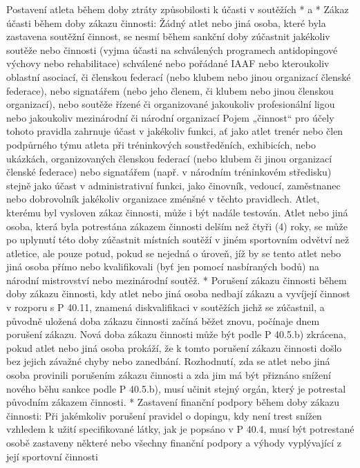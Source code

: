 Postavení atleta během doby ztráty způsobilosti k účasti v soutěžích
* \begitems \style a
  * Zákaz účasti během doby zákazu činnosti: Žádný atlet nebo jiná osoba, které byla zastavena soutěžní činnost, se nesmí během sankční doby zúčastnit jakékoliv soutěže nebo činnosti (vyjma účasti na schválených programech antidopingové výchovy nebo rehabilitace) schválené nebo pořádané IAAF nebo kteroukoliv oblastní asociací, či členskou federací (nebo klubem nebo jinou organizací členské federace), nebo signatářem (nebo jeho členem, či klubem nebo jinou členskou organizací), nebo soutěže řízené či organizované jakoukoliv profesionální ligou nebo jakoukoliv mezinárodní či národní organizací Pojem „činnost“ pro účely tohoto pravidla zahrnuje účast v jakékoliv funkci, ať jako atlet trenér nebo člen podpůrného týmu atleta při tréninkových soustředěních, exhibicích, nebo ukázkách, organizovaných členskou federací (nebo klubem či jinou organizací členské federace) nebo signatářem (např. v národním tréninkovém středisku) stejně jako účast v administrativní funkci, jako činovník, vedoucí, zaměstnanec nebo dobrovolník jakékoliv organizace zménšné v těchto pravidlech. Atlet, kterému byl vysloven zákaz činnosti, může i být nadále testován. Atlet nebo jiná osoba, která byla potrestána zákazem činnosti delším než čtyři (4) roky, se může po uplynutí této doby zúčastnit místních soutěží v jiném sportovním odvětví než atletice, ale pouze potud, pokud se nejedná o úroveň, jíž by se tento atlet nebo jiná osoba přímo nebo kvalifikovali (byť jen pomocí nasbíraných bodů) na národní mistrovství nebo mezinárodní soutěž.
  * Porušení zákazu činnosti během doby zákazu činnosti, kdy atlet nebo jiná osoba nedbají zákazu a vyvíjejí činnost v rozporu s P 40.11, znamená diskvalifikaci v soutěžích jichž se zúčastnil, a původně uložená doba zákazu činnosti začíná běžet znovu, počínaje dnem porušení zákazu. Nová doba zákazu činnosti může být podle P 40.5.b) zkrácena, pokud atlet nebo jiná osoba prokáží, že k tomto porušení zákazu činnosti došlo bez jejich závažné chyby nebo zanedbání. Rozhodnutí, zda se atlet nebo jiná osoba provinili porušením zákazu činnosti a zda jim má být přiznáno snížení nového běhu sankce podle P 40.5.b), musí učinit stejný orgán, který je potrestal původním zákazem činnosti.
  * Zastavení finanční podpory během doby zákazu činnosti: Při jakémkoliv porušení pravidel o dopingu, kdy není trest snížen vzhledem k užití specifikované látky, jak je popsáno v P 40.4, musí být potrestané osobě zastaveny některé nebo všechny finanční podpory a výhody vyplývající z její sportovní činnosti
  \enditems

